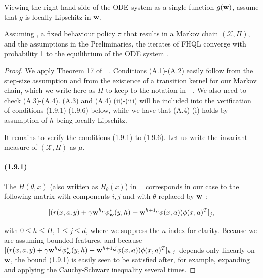 \begin{appendices}
\setcounter{theorem}{0}
\begin{theorem}
Viewing the right-hand side of the ODE system  as a single function $g(\mathbf{w})$, assume that $g$ is locally Lipschitz in $\mathbf{w}$. %

Assuming , a fixed behaviour policy $\pi$ that results in a Markov chain $(\mathcal{X}, \Pi)$, and the assumptions in the Preliminaries, the iterates of FHQL converge with probability 1 to the equilibrium of the ODE system .
\end{theorem}
\begin{proof}
We apply Theorem 17 of~\citeauthor[p.239]{benveniste1990stochastic}~. Conditions (A.1)-(A.2) easily follow from the step-size assumption and from the existence of a transition kernel for our Markov chain, which we write here as $\Pi$ to keep to the notation in~\citeauthor{benveniste1990stochastic}~. We also need to check (A.3)-(A.4). (A.3) and (A.4) (ii)-(iii) will be included into the verification of conditions (1.9.1)-(1.9.6) below, while we have that (A.4) (i) holds by assumption of $h$ being locally Lipschitz.

\noindent It remains to verify the conditions (1.9.1) to (1.9.6). Let us write the invariant measure of $(\mathcal{X}, \Pi)$ as $\mu$.

\paragraph{(1.9.1)}
The $H(\theta, x)$ (also written as $H_\theta(x)$) in~\citeauthor[p.239]{benveniste1990stochastic}~ corresponds in our case to the following matrix with components $i, j$ and with $\theta$ replaced by $\mathbf{w}$ :

\begin{equation}\label{eq:H}
    [(r(x, a, y) + \gamma \mathbf{w}^{h, :} \phi_{\mathbf{w}}^*(y, h) - \mathbf{w}^{h + 1, :} \phi(x, a))\phi(x, a)^T]_j,
\end{equation}

\noindent with $0 \leq h \leq H$, $1 \leq j \leq d$, where we suppress the $n$ index for clarity. Because we are assuming bounded features, and because $[(r(x, a, y) + \gamma \mathbf{w}^{h, j} \phi_{\mathbf{w}}^*(y, h) - \mathbf{w}^{h + 1, j} \phi(x, a))\phi(x, a)^T]_{h, j}$ depends only linearly on $\mathbf{w}$, the bound (1.9.1) is easily seen to be satisfied after, for example, expanding and applying the Cauchy-Schwarz inequality several times.



\end{proof}
\end{appendices}
